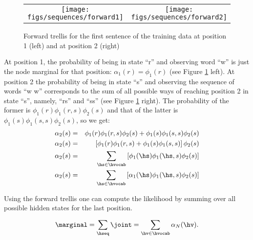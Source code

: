 \begin{figure}
\begin{center}
\begin{tabular}{cc}

\texttt{[image: figs/sequences/forward1]}
& \texttt{[image: figs/sequences/forward2]}\\
\end{tabular}
\caption[Forward backward example.]{\label{fig:fb} Forward trellis for
  the first sentence of the training data at position 1 (left) and at
  position 2 (right)}

\end{center}
\end{figure}

At position 1, the probability of being in state ``r'' and observing word ``w'' is just the node
marginal for that position: $\alpha_1(r) = \phi_1(r)$ (see Figure
 \ref{fig:fb} left). At position 2 the probability
of being in state ``s'' and observing the sequence of words ``w w''
corresponds to the sum of all possible ways of reaching position 2 in
state ``s'', namely, ``rs'' and ``ss'' (see Figure \ref{fig:fb} right). The probability of the former is
$\phi_1(r)\phi_1(r,s)\phi_2(s)$
and that of the latter is $\phi_1(s)\phi_1(s,s)\phi_2(s)$, so we get:
\begin{eqnarray*}
   \alpha_2(s) &=& \phi_1(r)\phi_1(r,s)\phi_2(s) +
   \phi_1(s)\phi_1(s,s)\phi_2(s) \\
   \alpha_2(s) &=& \left[\phi_1(r)\phi_1(r,s) +
   \phi_1(s)\phi_1(s,s) \right]\phi_2(s) \\
 \alpha_2(s) &=& \displaystyle \sum_{\hs \in \hvocab}
 \left[\phi_1(\hs)\phi_1(\hs,s)\phi_2(s) \right] \\
  \alpha_2(s) &=& \displaystyle \sum_{\hs \in \hvocab}
 \left[\alpha_1(\hs)\phi_1(\hs,s)\phi_2(s) \right]
\end{eqnarray*}

Using the forward trellis one can compute the likelihood by summing
over all possible hidden states for the last position.

\begin{equation}
\label{eq:forwardSum}
\marginal = \displaystyle \sum_{\hseq} \joint = \displaystyle \sum_{\hv \in \hvocab} \alpha_N(\hv) .
\end{equation}

